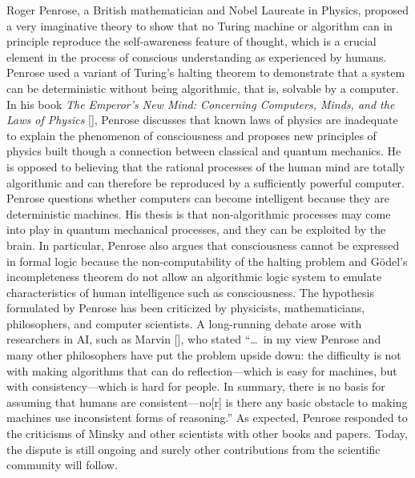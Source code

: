 Roger Penrose, a British mathematician and Nobel Laureate in Physics, proposed a very imaginative theory to show that no Turing machine or algorithm can in principle reproduce the self-awareness feature of thought, which is a crucial element in the process of conscious understanding as experienced by humans. Penrose used a variant of Turing's halting theorem to demonstrate that a system can be deterministic without being algorithmic, that is, solvable by a computer. In his book \textit{The Emperor's New Mind: Concerning Computers, Minds, and the Laws of Physics }[\citealt{chap:11:Penrose:2016}], Penrose discusses that known laws of physics are inadequate to explain the phenomenon of consciousness and proposes new principles of physics built though a connection between classical and quantum mechanics. He is opposed to believing that the rational processes of the human mind are totally algorithmic and can therefore be reproduced by a sufficiently powerful computer. Penrose questions whether computers can become intelligent because they are deterministic machines. His thesis is that non-algorithmic processes may come into play in quantum mechanical processes, and they can be exploited by the brain. In particular, Penrose also argues that consciousness cannot be expressed in formal logic because the non-computability of the halting problem and G\"{o}del's incompleteness theorem do not allow an algorithmic logic system to emulate characteristics of human intelligence such as consciousness. The hypothesis formulated by Penrose has been criticized by physicists, mathematicians, philosophers, and computer scientists. A long-running debate arose with researchers in AI, such as Marvin \citeauthor{chap:11:Minsky:1991} [\citeyear{chap:11:Minsky:1991}], who stated ``\dots\ in my view Penrose and many other philosophers have put the problem upside down: the difficulty is not with making algorithms that can do reflection---which is easy for machines, but with consistency---which is hard for people. In summary, there is no basis for assuming that humans are consistent---no[r] is there any basic obstacle to making machines use inconsistent forms of reasoning.'' As expected, Penrose responded to the criticisms of Minsky and other scientists with other books and papers. Today, the dispute is still ongoing and surely other contributions from the scientific community will follow.


